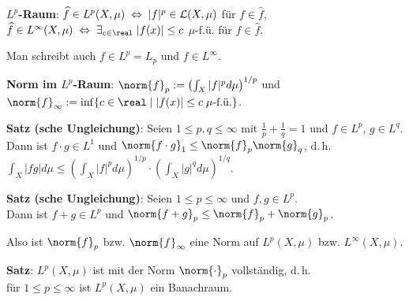 \textbf{$L^p$-Raum}:
$\widehat{f} \in L^p(X, \mu) \;\Leftrightarrow\; |f|^p \in \mathcal{L}(X, \mu)$ für
$f \in \widehat{f}$, \\
$\widehat{f} \in L^\infty(X, \mu) \;\Leftrightarrow\;
\exists_{c \in \real}\; |f(x)| \le c$ $\mu$-f.ü. für $f \in \widehat{f}$.

Man schreibt auch $f \in L^p = L_p$ und $f \in L^\infty$.

\linie

\textbf{Norm im $L^p$-Raum}:
$\norm{f}_p := \left(\int_X |f|^p d\mu\right)^{1/p}$ und
$\norm{f}_\infty := \inf \{c \in \real \;|\; |f(x)| \le c\; \mu\text{-f.ü.}\}$.

\textbf{Satz (sche Ungleichung)}:
Seien $1 \le p, q \le \infty$ mit $\frac{1}{p} + \frac{1}{q} = 1$
und $f \in L^p$, $g \in L^q$. \\
Dann ist $f \cdot g \in L^1$ und
$\norm{f \cdot g}_1 \le \norm{f}_p \norm{g}_q$, d.\,h.
$\int_X |fg| d\mu \le \left(\int_X |f|^p d\mu\right)^{1/p} \cdot
\left(\int_X |g|^q d\mu\right)^{1/q}$.

\textbf{Satz (sche Ungleichung)}:
Seien $1 \le p \le \infty$ und $f, g \in L^p$. \\
Dann ist $f + g \in L^p$ und
$\norm{f + g}_p \le \norm{f}_p + \norm{g}_p$.

Also ist $\norm{f}_p$ bzw. $\norm{f}_\infty$ eine Norm auf $L^p(X, \mu)$ bzw.
$L^\infty(X, \mu)$.

\linie

\textbf{Satz}:
$L^p(X, \mu)$ ist mit der Norm $\norm{\cdot}_p$ vollständig, d.\,h. \\
für $1 \le p \le \infty$ ist $L^p(X, \mu)$ ein Banachraum.

\linie

